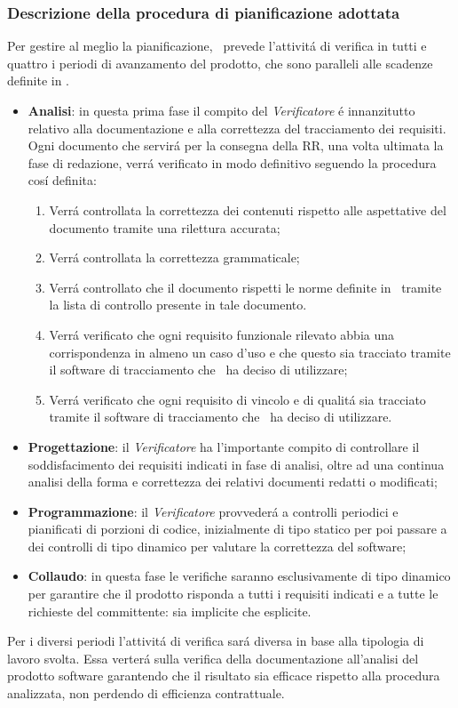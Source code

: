 \subsubsection{Descrizione della procedura di pianificazione adottata}
Per gestire al meglio la pianificazione, \gruppo ~prevede l'attivit\'a di verifica in tutti e quattro i periodi di avanzamento del prodotto, che sono paralleli alle scadenze definite in \infoPDP.
\begin{itemize}
\item \textbf{Analisi}: in questa prima fase il compito del \textit{Verificatore} \'e innanzitutto relativo alla documentazione e alla correttezza del tracciamento dei requisiti. Ogni documento che servir\'a per la consegna della RR, una volta ultimata la fase di redazione, verr\'a verificato in modo definitivo seguendo la procedura cos\'i definita:
\begin{enumerate}
\item Verr\'a controllata la correttezza dei contenuti rispetto alle aspettative del documento tramite una rilettura accurata;
\item Verr\'a controllata la correttezza grammaticale;
\item Verr\'a controllato che il documento rispetti le norme definite in \infoNDP ~tramite la lista di controllo presente in tale documento.
\item Verr\'a verificato che ogni requisito funzionale rilevato abbia una corrispondenza in almeno un caso d'uso e che questo sia tracciato tramite il software di tracciamento che \gruppo ~ha deciso di utilizzare;
\item Verr\'a verificato che ogni requisito di vincolo e di qualit\'a sia tracciato tramite il software di tracciamento che \gruppo ~ha deciso di utilizzare.
\end{enumerate}
\item \textbf{Progettazione}: il \textit{Verificatore} ha l'importante compito di controllare il soddisfacimento dei requisiti indicati in fase di analisi, oltre ad una continua analisi della forma e correttezza dei relativi documenti redatti o modificati;
\item \textbf{Programmazione}: il \textit{Verificatore} provveder\'a a controlli periodici e pianificati di porzioni di codice, inizialmente di tipo statico per poi passare a dei controlli di tipo dinamico per valutare la correttezza del software;
\item \textbf{Collaudo}: in questa fase le verifiche saranno esclusivamente di tipo dinamico per garantire che il prodotto risponda a tutti i requisiti indicati e a tutte le richieste del committente: sia implicite che esplicite.
\end{itemize}
Per i diversi periodi l'attivit\'a di verifica sar\'a diversa in base alla tipologia di lavoro svolta. Essa verter\'a sulla verifica della documentazione all'analisi del prodotto software garantendo che il risultato sia efficace rispetto alla procedura analizzata, non perdendo di efficienza contrattuale. 
